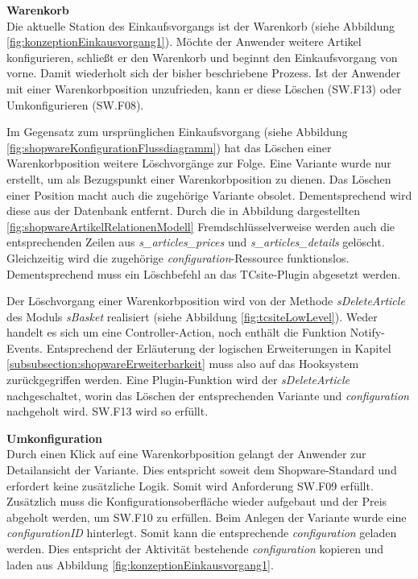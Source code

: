 \documentclass[11pt, a4paper, titlepage, listof=totoc, bibliography=totoc, index=totoc, twoside, openright, headings=normal]{scrreprt}
\begin{document}
\textbf{Warenkorb}\\
Die aktuelle Station des Einkaufsvorgangs ist der Warenkorb (siehe Abbildung \ref{fig:konzeptionEinkausvorgang1}). Möchte der Anwender weitere Artikel konfigurieren, schließt er den Warenkorb und beginnt den Einkaufsvorgang von vorne. Damit wiederholt sich der bisher beschriebene Prozess. Ist der Anwender mit einer Warenkorbposition unzufrieden, kann er diese Löschen (SW.F13) oder Umkonfigurieren (SW.F08).

Im Gegensatz zum ursprünglichen Einkaufsvorgang (siehe Abbildung \ref{fig:shopwareKonfigurationFlussdiagramm}) hat das Löschen einer Warenkorbposition weitere Löschvorgänge zur Folge. Eine Variante wurde nur erstellt, um als Bezugspunkt einer Warenkorbposition zu dienen. Das Löschen einer Position macht auch die zugehörige Variante obsolet. Dementsprechend wird diese aus der Datenbank entfernt. Durch die in Abbildung dargestellten \ref{fig:shopwareArtikelRelationenModell} Fremdschlüsselverweise werden auch die entsprechenden Zeilen aus \emph{s\_articles\_prices} und \emph{s\_articles\_details}  gelöscht. Gleichzeitig wird die zugehörige \emph{configuration}-Ressource funktionslos. Dementsprechend muss ein Löschbefehl an das TCsite-Plugin abgesetzt werden.

Der Löschvorgang einer Warenkorbposition wird von der Methode \emph{sDeleteArticle} des Moduls \emph{sBasket} realisiert (siehe Abbildung \ref{fig:tcsiteLowLevel}). Weder handelt es sich um eine Controller-Action, noch enthält die Funktion Notify-Events. Entsprechend der Erläuterung der logischen Erweiterungen in Kapitel \ref{subsubsection:shopwareErweiterbarkeit} muss also auf das Hooksystem zurückgegriffen werden. Eine Plugin-Funktion wird der \emph{sDeleteArticle} nachgeschaltet, worin das Löschen der entsprechenden Variante und \emph{configuration} nachgeholt wird. SW.F13 wird so erfüllt.

\textbf{Umkonfiguration}\\
Durch einen Klick auf eine Warenkorbposition gelangt der Anwender zur Detailansicht der Variante. Dies entspricht soweit dem Shopware-Standard und erfordert keine zusätzliche Logik. Somit wird Anforderung SW.F09 erfüllt. Zusätzlich muss die Konfigurationsoberfläche wieder aufgebaut und der Preis abgeholt werden, um SW.F10 zu erfüllen. Beim Anlegen der Variante wurde eine \emph{configurationID} hinterlegt. Somit kann die entsprechende \emph{configuration} geladen werden. Dies entspricht der Aktivität \glqq bestehende \emph{configuration} kopieren und laden\grqq{} aus Abbildung \ref{fig:konzeptionEinkausvorgang1}.
\end{document}
